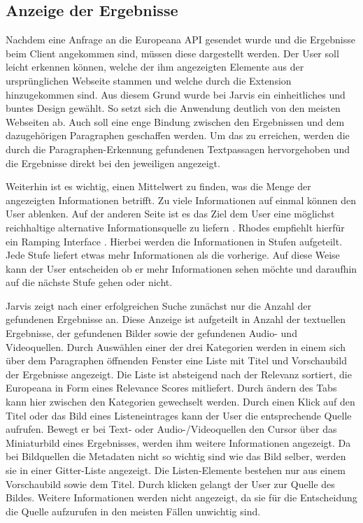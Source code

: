  \subsection{Anzeige der Ergebnisse}
 Nachdem eine Anfrage an die Europeana API gesendet wurde und die Ergebnisse beim Client angekommen sind, müssen diese dargestellt werden. Der User soll leicht erkennen können, welche der ihm angezeigten Elemente aus der ursprünglichen Webseite stammen und welche durch die Extension hinzugekommen sind. Aus diesem Grund wurde bei Jarvis ein einheitliches und buntes Design gewählt. So setzt sich die Anwendung deutlich von den meisten Webseiten ab. Auch soll eine enge Bindung zwischen den Ergebnissen und dem dazugehörigen Paragraphen geschaffen werden. Um das zu erreichen, werden die durch die Paragraphen-Erkennung gefundenen Textpassagen hervorgehoben und die Ergebnisse direkt bei den jeweiligen angezeigt.

 Weiterhin ist es wichtig, einen Mittelwert zu finden, was die Menge der angezeigten Informationen betrifft. Zu viele Informationen auf einmal können den User ablenken. Auf der anderen Seite ist es das Ziel dem User eine möglichst reichhaltige alternative Informationsquelle zu liefern \cite{rhodes2000margin}. Rhodes empfiehlt hierfür ein Ramping Interface \cite{rhodes2000just}. Hierbei werden die Informationen in Stufen aufgeteilt. Jede Stufe liefert etwas mehr Informationen als die vorherige. Auf diese Weise kann der User entscheiden ob er mehr Informationen sehen möchte und daraufhin auf die nächste Stufe gehen oder nicht.

 Jarvis zeigt nach einer erfolgreichen Suche zunächst nur die Anzahl der gefundenen Ergebnisse an. Diese Anzeige ist aufgeteilt in Anzahl der textuellen Ergebnisse, der gefundenen Bilder sowie der gefundenen Audio- und Videoquellen. Durch Auswählen einer der drei Kategorien werden in einem sich über dem Paragraphen öffnenden Fenster eine Liste mit Titel und Vorschaubild der Ergebnisse angezeigt. Die Liste ist absteigend nach der Relevanz sortiert, die Europeana in Form eines Relevance Scores mitliefert. Durch ändern des Tabs kann hier zwischen den Kategorien gewechselt werden.
 Durch einen Klick auf den Titel oder das Bild eines Listeneintrages kann der User die entsprechende Quelle aufrufen. Bewegt er bei Text- oder Audio-/Videoquellen den Cursor über das Miniaturbild eines Ergebnisses, werden ihm weitere Informationen angezeigt. Da bei Bildquellen die Metadaten nicht so wichtig sind wie das Bild selber, werden sie in einer Gitter-Liste angezeigt. Die Listen-Elemente bestehen nur aus einem Vorschaubild sowie dem Titel. Durch klicken gelangt der User zur Quelle des Bildes. Weitere Informationen werden nicht angezeigt, da sie für die Entscheidung die Quelle aufzurufen in den meisten Fällen unwichtig sind.

